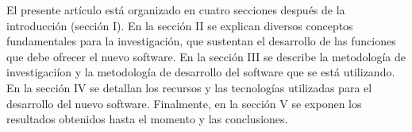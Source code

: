 \documentclass[conference]{IEEEtran}
\begin{document}
El presente art\'{i}culo est\'{a} organizado en cuatro secciones despu\'{e}s de la introducci\'{o}n (secci\'{o}n I). En la secci\'{o}n II se explican diversos conceptos fundamentales para la investigaci\'{o}n, que sustentan el desarrollo de las funciones que debe ofrecer el nuevo software. En la secci\'{o}n III se describe la metodolog\'{i}a de investigaci\'{i}on y la metodolog\'{i}a de desarrollo del software que se est\'{a} utilizando. En la secci\'{o}n IV se detallan los recursos y las tecnolog\'{i}as utilizadas para el desarrollo del nuevo software. Finalmente, en la secci\'{o}n V se exponen los resultados obtenidos hasta el momento y las conclusiones.


%
%



%
%
\end{document}
